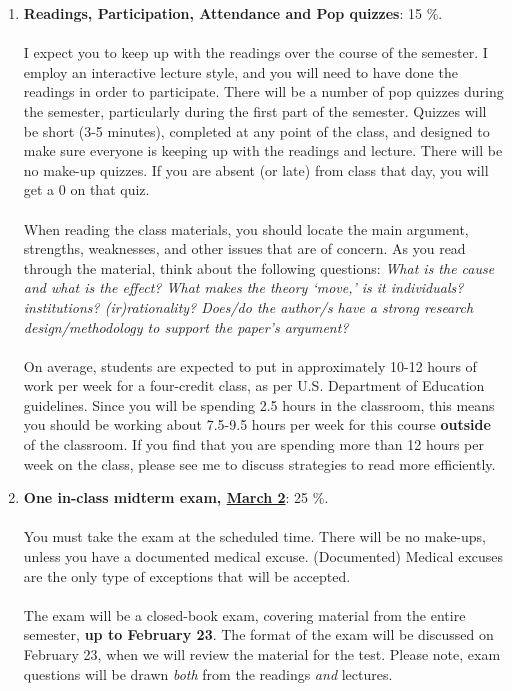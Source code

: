 \documentclass[letterpaper]{article}
\begin{document}
\begin{enumerate}

	\item {\bf Readings, Participation, Attendance and Pop quizzes}: 15 \%.
	\\
	\\
	I expect you to keep up with the readings over the course of the semester. I employ an interactive lecture style, and you will need to have done the readings in order to participate. There will be a number of pop quizzes during the semester, particularly during the first part of the semester.  Quizzes will be short (3-5 minutes), completed at any point of the class, and designed to make sure everyone is keeping up with the readings and lecture. There will be no make-up quizzes. If you are absent (or late) from class that day, you will get a $0$ on that quiz. 
	\\
	\\
	When reading the class materials, you should locate the main argument, strengths, weaknesses, and other issues that are of concern. As you read through the material, think about the following questions: \emph{What is the cause and what is the effect? What makes the theory `move,' is it individuals? institutions? (ir)rationality? Does/do the author/s have a strong research design/methodology to support the paper's argument?} 
	\\
	\\
	On average, students are expected to put in approximately 10-12 hours of work per week for a four-credit class, as per U.S. Department of Education guidelines.  Since you will be spending 2.5 hours in the classroom, this means you should be working about 7.5-9.5 hours per week for this course {\bf outside} of the classroom. If you find that you are spending more than 12 hours per week on the class, please see me to discuss strategies to read more efficiently. 


	\item {\bf One in-class midterm exam, \underline{March 2}}: 25 \%. 
	\\
	\\
	You must take the exam at the scheduled time. There will be no make-ups, unless you have a documented medical excuse. (Documented) Medical excuses are the only type of exceptions that will be accepted.
	\\
	\\
	The exam will be a closed-book exam, covering material from the entire semester, {\bf up to February 23}. The format of the exam will be discussed on February 23, when we will review the material for the test. Please note, exam questions will be drawn \emph{both} from the readings \emph{and} lectures.



\end{enumerate}
\end{document}
